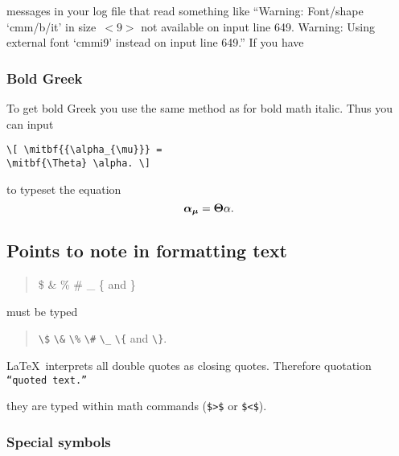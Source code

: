messages in your log file that read something like ``Warning: Font/shape
`cmm/b/it' in size~\hbox{$< \!\! 9 \!\! >$} not available on input line 649.
Warning: Using external font `cmmi9' instead on input line 649.'' If you have


\subsubsection{Bold Greek}\label{boldgreek}

To get bold Greek you use the same method as for bold math italic. Thus you can
input
\begin{verbatim}
\[ \mitbf{{\alpha_{\mu}}} =
\mitbf{\Theta} \alpha. \]
\end{verbatim}
to typeset the equation \[ \mitbf{{\alpha_{\mu}}} = \mitbf{\Theta} \alpha. \]


\subsection{Points to note in formatting text}\label{formtext}

\begin{quote}
\$ \& \% \# \_ \{ and \}
\end{quote}
must be typed
\begin{center}
\begin{quote}
\verb"\$" \verb"\&" \verb"\%" \verb"\#" \verb"\_" \verb"\{" and \verb"\}".
\end{quote}
\end{center}

\LaTeX\ interprets all double quotes as closing quotes. Therefore quotation
\texttt{``quoted text.''}

they are typed within math commands (\verb"$>$" or \verb"$<$").

\subsubsection{Special symbols}

